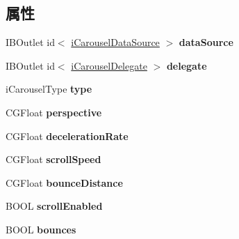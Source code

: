 \subsection*{属性}
\begin{DoxyCompactItemize}
\item 
\hypertarget{interfacei_carousel_a01932ed8ad51ec7c851ec2c16d7dbf88}{I\-B\-Outlet id$<$ \hyperlink{protocoli_carousel_data_source-p}{i\-Carousel\-Data\-Source} $>$ {\bfseries data\-Source}}\label{interfacei_carousel_a01932ed8ad51ec7c851ec2c16d7dbf88}

\item 
\hypertarget{interfacei_carousel_ac92c2f2737dd0a4c113d198bb9e4120c}{I\-B\-Outlet id$<$ \hyperlink{protocoli_carousel_delegate-p}{i\-Carousel\-Delegate} $>$ {\bfseries delegate}}\label{interfacei_carousel_ac92c2f2737dd0a4c113d198bb9e4120c}

\item 
\hypertarget{interfacei_carousel_ad0a1baa683ced94711f696e393ba8ff5}{i\-Carousel\-Type {\bfseries type}}\label{interfacei_carousel_ad0a1baa683ced94711f696e393ba8ff5}

\item 
\hypertarget{interfacei_carousel_a8d8abcfd2ddafba0637ff5ca9531e92e}{C\-G\-Float {\bfseries perspective}}\label{interfacei_carousel_a8d8abcfd2ddafba0637ff5ca9531e92e}

\item 
\hypertarget{interfacei_carousel_ab00e8633c7b9b8bc69d36cbfaa67e590}{C\-G\-Float {\bfseries deceleration\-Rate}}\label{interfacei_carousel_ab00e8633c7b9b8bc69d36cbfaa67e590}

\item 
\hypertarget{interfacei_carousel_a990b3ebf8b1d389bd0ed42a7a9258e5f}{C\-G\-Float {\bfseries scroll\-Speed}}\label{interfacei_carousel_a990b3ebf8b1d389bd0ed42a7a9258e5f}

\item 
\hypertarget{interfacei_carousel_abd605dc751d9653c8f809d17cecc7b67}{C\-G\-Float {\bfseries bounce\-Distance}}\label{interfacei_carousel_abd605dc751d9653c8f809d17cecc7b67}

\item 
\hypertarget{interfacei_carousel_a97df41172333d67ef60bf700503c6578}{B\-O\-O\-L {\bfseries scroll\-Enabled}}\label{interfacei_carousel_a97df41172333d67ef60bf700503c6578}

\item 
\hypertarget{interfacei_carousel_a90a750b16e48dd04e1b5edf1fe8b6d79}{B\-O\-O\-L {\bfseries bounces}}\label{interfacei_carousel_a90a750b16e48dd04e1b5edf1fe8b6d79}


\end{DoxyCompactItemize}
